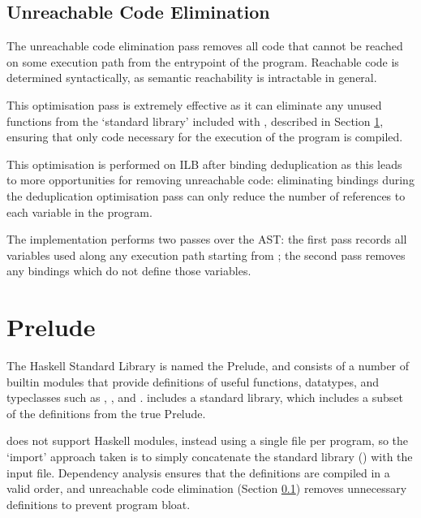 \documentclass[dissertation.tex]{subfiles}
\begin{document}
{    \subsection{Unreachable Code Elimination}\label{sec:unreachable-elim}
    {
        The unreachable code elimination pass removes all code that cannot be reached on some execution path from the entrypoint of the program. Reachable code is determined syntactically, as semantic reachability is intractable in general.

        This optimisation pass is extremely effective as it can eliminate any unused functions from the `standard library' included with \compilername, described in Section \ref{sec:prelude}, ensuring that only code necessary for the execution of the program is compiled.

        This optimisation is performed on ILB after binding deduplication as this leads to more opportunities for removing unreachable code: eliminating bindings during the deduplication optimisation pass can only reduce the number of references to each variable in the program.

        The implementation performs two passes over the AST: the first pass records all variables used along any execution path starting from ; the second pass removes any bindings which do not define those variables.
    }
}
\section{Prelude}\label{sec:prelude}
{
    The Haskell Standard Library is named the Prelude, and consists of a number of builtin modules that provide definitions of useful functions, datatypes, and typeclasses such as , , and . \compilername includes a standard library, which includes a subset of the definitions from the true Prelude.
    
    \compilername does not support Haskell modules, instead using a single file per program, so the `import' approach taken is to simply concatenate the standard library () with the input file. Dependency analysis ensures that the definitions are compiled in a valid order, and unreachable code elimination (Section \ref{sec:unreachable-elim}) removes unnecessary definitions to prevent program bloat.
}
\end{document}
